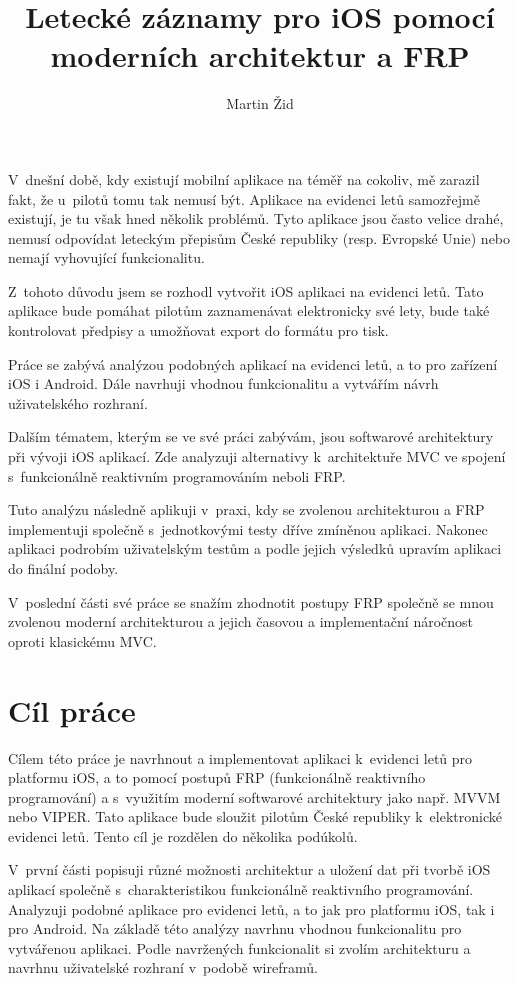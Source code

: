 \documentclass[thesis=M,czech]{FITthesis}[2012/06/26]
\title{Letecké záznamy pro iOS pomocí moderních architektur a FRP}
\author{Martin Žid} %
\begin{document}

\begin{introduction}
V~dnešní době, kdy existují mobilní aplikace na téměř na cokoliv, mě zarazil fakt, že u~pilotů tomu tak nemusí být. Aplikace na evidenci letů samozřejmě existují, je tu však hned několik problémů. Tyto aplikace jsou často velice drahé, nemusí odpovídat leteckým přepisům České republiky (resp. Evropské Unie) nebo nemají vyhovující funkcionalitu.

Z~tohoto důvodu jsem se rozhodl vytvořit iOS aplikaci na evidenci letů. Tato aplikace bude pomáhat pilotům zaznamenávat elektronicky své lety, bude také kontrolovat předpisy a umožňovat export do formátu pro tisk.

Práce se zabývá analýzou podobných aplikací na evidenci letů, a to pro zařízení iOS i Android. Dále navrhuji vhodnou funkcionalitu a vytvářím návrh uživatelského rozhraní.

Dalším tématem, kterým se ve své práci zabývám, jsou softwarové architektury při vývoji iOS aplikací. Zde analyzuji alternativy k~architektuře MVC ve spojení s~funkcionálně reaktivním programováním neboli FRP.

Tuto analýzu následně aplikuji v~praxi, kdy se zvolenou architekturou a FRP implementuji společně s~jednotkovými testy dříve zmíněnou aplikaci. Nakonec aplikaci podrobím uživatelským testům a podle jejich výsledků
upravím aplikaci do finální podoby.

V~poslední části své práce se snažím zhodnotit postupy FRP společně se mnou zvolenou moderní architekturou a jejich časovou a implementační náročnost oproti klasickému MVC.
\end{introduction}

\chapter{Cíl práce}
Cílem této práce je navrhnout a implementovat aplikaci k~evidenci letů pro platformu iOS, a to pomocí postupů FRP (funkcionálně reaktivního programování) a s~využitím moderní softwarové architektury jako např. MVVM nebo VIPER.  Tato aplikace bude sloužit pilotům České republiky k~elektronické evidenci letů. Tento cíl je rozdělen do několika podúkolů.

V~první části popisuji různé možnosti architektur a uložení dat při tvorbě iOS aplikací společně s~charakteristikou funkcionálně reaktivního programování. Analyzuji podobné aplikace pro evidenci letů, a to jak pro platformu iOS, tak i pro Android. Na základě této analýzy navrhnu vhodnou funkcionalitu pro vytvářenou aplikaci. Podle navržených funkcionalit si zvolím architekturu a navrhnu uživatelské rozhraní v~podobě wireframů.
\end{document}
